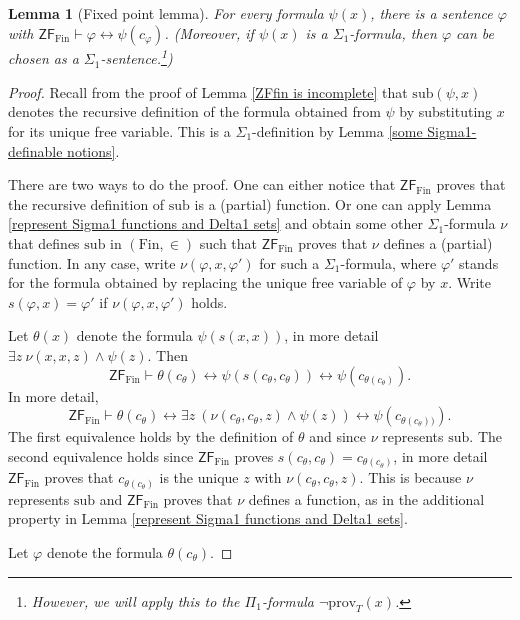 \documentclass[a4paper, 11pt]{amsart}
\newtheorem{lemma}[lemma]{Lemma}
\theoremstyle{remark}
\newcommand{\axiomft}[1]{\mathsf{#1}}
\newcommand{\ZF}{\axiomft{ZF}}
\newcommand{\Fin}{\mathrm{Fin}}
\newcommand{\prov}{\mathrm{prov}}
\begin{document}
\begin{lemma}[Fixed point lemma]
\label{fixed point lemma} 
For every formula $\psi(x)$, there is a sentence $\varphi$ with $\ZF_\Fin \vdash \varphi \longleftrightarrow \psi(c_\varphi)$. 
(Moreover, if $\psi(x)$ is a $\Sigma_1$-formula, then $\varphi$ can be chosen as a $\Sigma_1$-sentence.\footnote{However, we will apply this to the $\Pi_1$-formula $\neg\prov_T(x)$.})
\end{lemma} 
\begin{proof} 
Recall from the proof of Lemma \ref{ZFfin is incomplete} that $\mathrm{sub}(\psi,x)$ denotes the recursive definition of the formula obtained from $\psi$ by substituting $x$ for its unique free variable. 
This is a $\Sigma_1$-definition by Lemma \ref{some Sigma1-definable notions}. 

There are two ways to do the proof. 
One can either notice that $\ZF_\Fin$ proves that the recursive definition of $\mathrm{sub}$ is a (partial) function. 
Or one can apply Lemma  \ref{represent Sigma1 functions and Delta1 sets} and obtain some other $\Sigma_1$-formula $\nu$ that defines $\mathrm{sub}$ in $(\Fin,\in)$ such that $\ZF_\Fin$ proves that $\nu$ defines a (partial) function. 
In any case, write $\nu(\varphi,x,\varphi')$ for such a $\Sigma_1$-formula, where $\varphi'$ stands for the formula obtained by replacing the unique free variable of $\varphi$ by $x$. Write $s(\varphi,x)=\varphi'$ if $\nu(\varphi,x,\varphi')$ holds. 

Let $\theta(x)$ denote the formula $\psi(s(x,x))$, in more detail $\exists z\ \nu(x,x,z) \wedge \psi(z)$. 
Then 
$$  \ZF_\Fin \vdash    \theta(c_\theta)    \longleftrightarrow   \psi(s(c_\theta, c_\theta))  \longleftrightarrow \psi(c_{\theta(c_\theta)}).  $$ 
In more detail, 
$$  \ZF_\Fin \vdash    \theta(c_\theta)    \longleftrightarrow  \exists z\ ( \nu(c_\theta, c_\theta,z) \wedge \psi(z)  )  \longleftrightarrow \psi(c_{\theta(c_\theta))}). $$ 
The first equivalence holds by the definition of $\theta$ and since $\nu$ represents $\mathrm{sub}$. 
The second equivalence holds since 
$\ZF_\Fin$ proves $s(c_\theta,c_\theta)=c_{\theta(c_\theta)}$, in more detail $\ZF_\Fin$ proves that $c_{\theta(c_\theta)}$ is the unique $z$ with $\nu(c_\theta, c_\theta,z)$. 
This is because $\nu$ represents $\mathrm{sub}$ and $\ZF_\Fin$ proves that $\nu$ defines a function, as in the additional property in Lemma \ref{represent Sigma1 functions and Delta1 sets}. 

Let $\varphi$ denote the formula $\theta(c_\theta)$. 
\end{proof} 
\end{document}
